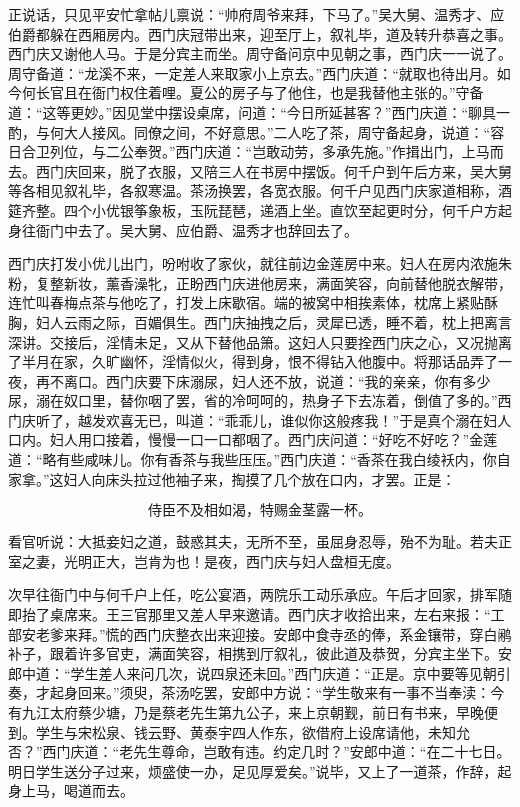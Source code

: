正说话，只见平安忙拿帖儿禀说：“帅府周爷来拜，下马了。”吴大舅、温秀才、应伯爵都躲在西厢房内。西门庆冠带出来，迎至厅上，叙礼毕，道及转升恭喜之事。西门庆又谢他人马。于是分宾主而坐。周守备问京中见朝之事，西门庆一一说了。周守备道：“龙溪不来，一定差人来取家小上京去。”西门庆道：“就取也待出月。如今何长官且在衙门权住着哩。夏公的房子与了他住，也是我替他主张的。”守备道：“这等更妙。”因见堂中摆设桌席，问道：“今日所延甚客？”西门庆道：“聊具一酌，与何大人接风。同僚之间，不好意思。”二人吃了茶，周守备起身，说道：“容日合卫列位，与二公奉贺。”西门庆道：“岂敢动劳，多承先施。”作揖出门，上马而去。西门庆回来，脱了衣服，又陪三人在书房中摆饭。何千户到午后方来，吴大舅等各相见叙礼毕，各叙寒温。茶汤换罢，各宽衣服。何千户见西门庆家道相称，酒筵齐整。四个小优银筝象板，玉阮琵琶，递酒上坐。直饮至起更时分，何千户方起身往衙门中去了。吴大舅、应伯爵、温秀才也辞回去了。

西门庆打发小优儿出门，吩咐收了家伙，就往前边金莲房中来。妇人在房内浓施朱粉，复整新妆，薰香澡牝，正盼西门庆进他房来，满面笑容，向前替他脱衣解带，连忙叫春梅点茶与他吃了，打发上床歇宿。端的被窝中相挨素体，枕席上紧贴酥胸，妇人云雨之际，百媚俱生。西门庆抽拽之后，灵犀已透，睡不着，枕上把离言深讲。交接后，淫情未足，又从下替他品箫。这妇人只要拴西门庆之心，又况抛离了半月在家，久旷幽怀，淫情似火，得到身，恨不得钻入他腹中。将那话品弄了一夜，再不离口。西门庆要下床溺尿，妇人还不放，说道：“我的亲亲，你有多少尿，溺在奴口里，替你咽了罢，省的冷呵呵的，热身子下去冻着，倒值了多的。”西门庆听了，越发欢喜无已，叫道：“乖乖儿，谁似你这般疼我！”于是真个溺在妇人口内。妇人用口接着，慢慢一口一口都咽了。西门庆问道：“好吃不好吃？”金莲道：“略有些咸味儿。你有香茶与我些压压。”西门庆道：“香茶在我白绫袄内，你自家拿。”这妇人向床头拉过他袖子来，掏摸了几个放在口内，才罢。正是：

\[
侍臣不及相如渴，特赐金茎露一杯。
\]

看官听说：大抵妾妇之道，鼓惑其夫，无所不至，虽屈身忍辱，殆不为耻。若夫正室之妻，光明正大，岂肯为也！是夜，西门庆与妇人盘桓无度。

次早往衙门中与何千户上任，吃公宴酒，两院乐工动乐承应。午后才回家，排军随即抬了桌席来。王三官那里又差人早来邀请。西门庆才收拾出来，左右来报：“工部安老爹来拜。”慌的西门庆整衣出来迎接。安郎中食寺丞的俸，系金镶带，穿白鹇补子，跟着许多官吏，满面笑容，相携到厅叙礼，彼此道及恭贺，分宾主坐下。安郎中道：“学生差人来问几次，说四泉还未回。”西门庆道：“正是。京中要等见朝引奏，才起身回来。”须臾，茶汤吃罢，安郎中方说：“学生敬来有一事不当奉渎：今有九江太府蔡少塘，乃是蔡老先生第九公子，来上京朝觐，前日有书来，早晚便到。学生与宋松泉、钱云野、黄泰宇四人作东，欲借府上设席请他，未知允否？”西门庆道：“老先生尊命，岂敢有违。约定几时？”安郎中道：“在二十七日。明日学生送分子过来，烦盛使一办，足见厚爱矣。”说毕，又上了一道茶，作辞，起身上马，喝道而去。

